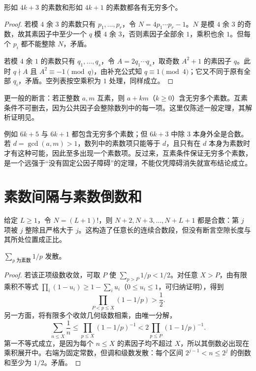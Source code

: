 \documentclass[UTF8,12pt,a4paper,fontset=fandol]{ctexbook}
\begin{document}
\begin{proposition}
形如 $4k+3$ 的素数和形如 $4k+1$ 的素数都各有无穷多个。
\end{proposition}
\begin{proof}
若模 $4$ 余 $3$ 的素数只有 $p_1,\ldots,p_r$，令 $N=4p_1\cdots p_r-1$。$N$ 是模 $4$ 余 $3$ 的奇数，故其素因子中至少一个 $q$ 模 $4$ 余 $3$，否则素因子全部余 $1$，乘积也余 $1$。但每个 $p_i$ 都不能整除 $N$，矛盾。

若模 $4$ 余 $1$ 的素数只有 $q_1,\ldots,q_s$，令 $A=2q_1\cdots q_s$，取奇数 $A^2+1$ 的素因子 $q$。此时 $q\nmid A$ 且 $A^2\equiv-1\pmod q$，由补充公式知 $q\equiv1\pmod4$；它又不同于原有全部 $q_i$，矛盾。空列表按空乘积为 $1$ 处理，同样成立。
\end{proof}

更一般的断言：若正整数 $a,m$ 互素，则 $a+km$（$k\ge0$）含无穷多个素数。互素条件不可删去，因为公共因子会整除数列中的每一项。这里仅陈述一般定理，其解析证明见\cite{kedlaya-dirichlet}。

例如 $6k+5$ 与 $6k+1$ 都包含无穷多个素数；但 $6k+3$ 中除 $3$ 本身外全是合数。若 $d=\gcd(a,m)>1$，数列中的素数项只能等于 $d$，且只有在 $d$ 本身为素数时才有这种可能，因此至多出现一个素数项。反过来，互素条件保证无穷多个素数，是一个远强于“没有固定公因子障碍”的定理，不能仅凭障碍消失就宣布结论成立。

\section{素数间隔与素数倒数和}

给定 $L\ge1$，令 $N=(L+1)!$，则 $N+2,N+3,\ldots,N+L+1$ 都是合数：第 $j$ 项被 $j$ 整除且严格大于 $j$。这构造了任意长的连续合数段，但没有断言空隙长度与其所处位置成正比。

\begin{theorem}[素数倒数和发散]
$\sum_{p\text{ 为素数}}1/p$ 发散。
\end{theorem}
\begin{proof}
若该正项级数收敛，可取 $P$ 使 $\sum_{p>P}1/p<1/2$。对任意 $X>P$，由有限乘积不等式 $\prod_i(1-u_i)\ge1-\sum_i u_i$（$0\le u_i\le1$，可归纳证明），得到
\[
 \prod_{P<p\le X}(1-1/p)>\frac12.
\]
另一方面，将有限多个收敛几何级数相乘，由唯一分解，
\[
 \sum_{n\le X}\frac1n
 \le\prod_{p\le X}(1-1/p)^{-1}
 <2\prod_{p\le P}(1-1/p)^{-1}.
\]
第一不等式成立，是因为每个 $n\le X$ 的素因子均不超过 $X$，所以其倒数必出现在乘积展开中。右端为固定常数，但调和级数发散：每个区间 $2^{j-1}<n\le2^j$ 的倒数和至少为 $1/2$。矛盾。
\end{proof}
\end{document}

